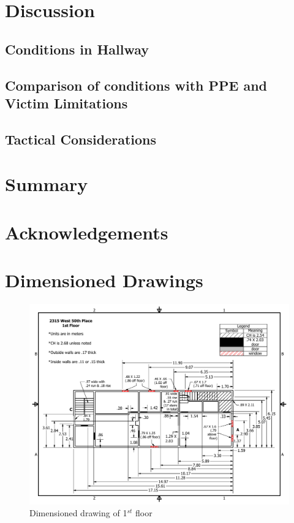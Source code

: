 \documentclass[11pt,oneside]{book}
\begin{document}
\chapter{Discussion}

\section{Conditions in Hallway}

\section{Comparison of conditions with PPE and Victim Limitations}

\section{Tactical Considerations}

\chapter{Summary}

\chapter{Acknowledgements}



\appendix

\chapter{Dimensioned Drawings}

\begin{figure}[h!]
\centering
\includegraphics[width=.80\textwidth]{../Figures/50th_Place_1st_Floor}
\caption {Dimensioned drawing of 1$^{st}$ floor}
\label{fig:first_floor}
\end{figure}
\end{document}

